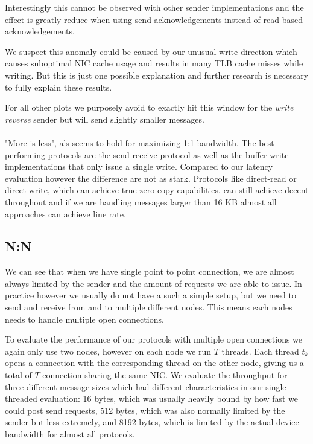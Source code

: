 Interestingly this cannot be observed with other sender implementations and the effect is greatly
reduce when using send acknowledgements instead of read based acknowledgements.

We suspect this anomaly could be caused by our unusual write direction which causes suboptimal NIC cache usage and 
results in many TLB cache misses while writing. But this is just one possible explanation and further research is 
necessary to fully explain these results.

For all other plots we purposely avoid to exactly hit this window for the \emph{write reverse}
sender but will send slightly smaller messages.


\paragraph{}"More is less", als seems to hold for maximizing 1:1 bandwidth. The best performing protocols are the send-receive 
protocol as well as the buffer-write implementations that only issue a single write. Compared to our latency evaluation
however the difference are not as stark. 
Protocols like direct-read or direct-write, which can achieve true zero-copy capabilities, can still achieve decent 
throughout and if we are handling messages larger than 16 KB almost all approaches can achieve line rate.








\pagebreak
\subsection{N:N}


We can see that when we have single point to point connection, we are almost always limited by the sender and the 
amount of requests we are able to issue. In practice however we usually do not have a such a simple setup, but we
need to send and receive from and to multiple different nodes. This means each nodes needs to handle multiple open
connections. 

To evaluate the performance of our protocols with multiple open connections we again only use two nodes, however  
on each node we run $T$ threads. Each thread $t_k$ opens a connection with the corresponding 
thread on the other node, giving us a total of $T$ connection sharing the same NIC. We evaluate the throughput for 
three different message sizes which had different characteristics in our single threaded evaluation: 16 bytes, 
which was usually heavily bound by how fast we could post send requests, 512 bytes, which was also normally limited by the 
sender but less extremely, and 8192 bytes, which is limited by the actual device bandwidth for almost all protocols. 

